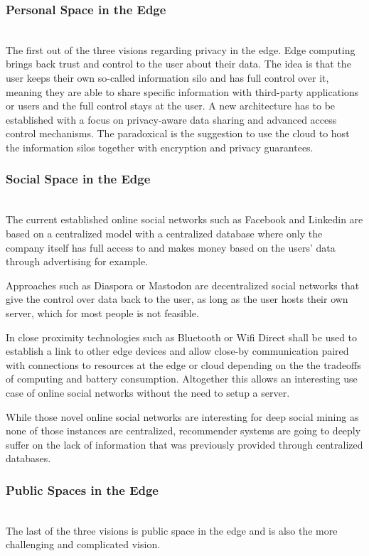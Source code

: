 \subsubsection{Personal Space in the Edge}\hspace*{\fill} \\
The first out of the three visions regarding privacy in the edge.
Edge computing brings back trust and control to the user about their data. The idea is that the user keeps their own so-called information silo and has full control over it, meaning they are able to share specific information with third-party applications or users and the full control stays at the user.
A new architecture has to be established with a focus on privacy-aware data sharing and advanced access control mechanisms. 
The paradoxical is the suggestion to use the cloud to host the information silos together with encryption and privacy guarantees.

\subsubsection{Social Space in the Edge}\hspace*{\fill} \\
The current established online social networks such as Facebook and Linkedin are based on a centralized model with a centralized database where only the company itself has full access to and makes money based on the users’ data through advertising for example.

Approaches such as Diaspora or Mastodon are decentralized social networks that give the control over data back to the user, as long as the user hosts their own server, which for most people is not feasible.

In close proximity technologies such as Bluetooth or Wifi Direct shall be used to establish a link to other edge devices and allow close-by communication paired with connections to resources at the edge or cloud depending on the the tradeoffs of computing and battery consumption. Altogether this allows an interesting use case of online social networks without the need to setup a server.

While those novel online social networks are interesting for deep social mining as none of those instances are centralized, recommender systems are going to deeply suffer on the lack of information that was previously provided through centralized databases.

\subsubsection{Public Spaces in the Edge}\hspace*{\fill} \\
The last of the three visions is public space in the edge and is also the more challenging and complicated vision.

